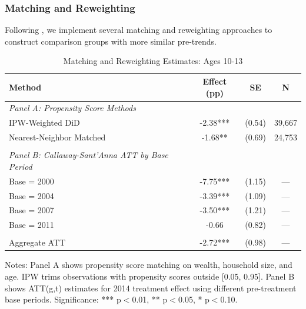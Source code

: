 \subsubsection{Matching and Reweighting}

Following \citet{CallawaySantanna2021}, we implement several matching and reweighting approaches to construct comparison groups with more similar pre-trends.

\begin{table}[H]
\centering
\caption{Matching and Reweighting Estimates: Ages 10-13}
\label{tab:matching}
\begin{threeparttable}
\begin{tabular}{lccc}
\toprule
Method & Effect (pp) & SE & N \\
\midrule
\textit{Panel A: Propensity Score Methods} & & & \\
\quad IPW-Weighted DiD & -2.38*** & (0.54) & 39,667 \\
\quad Nearest-Neighbor Matched & -1.68** & (0.69) & 24,753 \\
\\
\textit{Panel B: Callaway-Sant'Anna ATT by Base Period} & & & \\
\quad Base = 2000 & -7.75*** & (1.15) & --- \\
\quad Base = 2004 & -3.39*** & (1.09) & --- \\
\quad Base = 2007 & -3.50*** & (1.21) & --- \\
\quad Base = 2011 & -0.66 & (0.82) & --- \\
\\
\quad Aggregate ATT & -2.72*** & (0.98) & --- \\
\bottomrule
\end{tabular}
\begin{tablenotes}
\footnotesize
\item Notes: Panel A shows propensity score matching on wealth, household size, and age. IPW trims observations with propensity scores outside [0.05, 0.95]. Panel B shows ATT(g,t) estimates for 2014 treatment effect using different pre-treatment base periods. Significance: *** p$<$0.01, ** p$<$0.05, * p$<$0.10.
\end{tablenotes}
\end{threeparttable}
\end{table}

